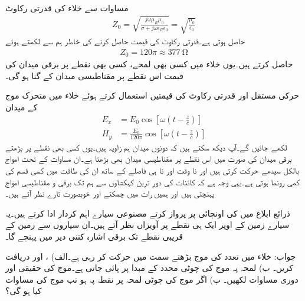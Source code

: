 مساوات  سے خلاء کی قدرتی رکاوٹ
\begin{align*}
Z_0 =\sqrt{\frac{j \omega \mu_R \mu_0}{\sigma +j \omega \epsilon_R \epsilon_0}}=\sqrt{\frac{\mu_0}{\epsilon_0}}
\end{align*}
حاصل ہوتی ہے۔قدرتی رکاوٹ کی قیمت حاصل کرنے کی خاطر ہم  سے  لکھتے ہوئے
\begin{align}
Z_0=120 \pi \approx \SI{377}{\ohm}
\end{align}
حاصل کرتے ہیں۔یوں خلاء میں کسی بھی لمحے، کسی بھی نقطے پر برقی میدان کی قیمت اس نقطے پر مقناطیسی میدان کے  گنا ہو گی۔

حرکی مستقل اور قدرتی رکاوٹ کی قیمتیں استعمال کرتے ہوئے خلاء میں متحرک موج کے میدان
\begin{align*}
E_x&=E_0 \cos \left[\omega \left( t -\frac{z}{c} \right)\right]\\
H_y&=\frac{E_0}{120 \pi} \cos \left[ \omega \left( t -\frac{z}{c} \right) \right]
\end{align*}
لکھے جائیں گے۔آپ دیکھ سکتے ہیں کہ دونوں میدان ہم زاویہ ہیں۔یوں کسی بھی نقطے پر بڑھتے برقی میدان کی صورت میں اس نقطے پر مقناطیسی میدان بھی بڑھتا ہے۔ان مساوات کے تحت امواج بالکل سیدھے حرکت کرتی ہیں اور نا وقت اور نا ہی فاصلے کے ساتھ ان کی طاقت میں کسی قسم کی کمی رونما ہوتی ہے۔یہی وجہ ہے کہ کائنات کی دور ترین کہکشاوں سے ہم تک برقی و مقناطیسی امواج پہنچتی ہیں اور ہمیں رات میں چمکتے اور خوبصورت تارے نظر آتے ہیں۔


 ذرائع ابلاغ میں  کی اونچائی پر پرواز کرتے مصنوعی سیارے اہم کردار ادا کرتے ہیں۔یہ سیارے زمین کے اوپر ایک ہی نقطے پر آویزاں نظر آتے ہیں۔ان سیاروں سے زمین کے قریبی نقطے تک برقی اشارہ کتنی دیر میں پہنچے گا۔

جواب:
خلاء میں  تعدد کی موج بڑھتے  سمت میں حرکت کر رہی ہے۔الف) ،  اور  دریافت کریں۔ ب) لمحہ  پہ موج کی  چوٹی  محدد کے مبدا پر پائی جاتی ہے۔موج کی حقیقی اور دوری مساوات لکھیں۔ پ) اگر موج کی چوٹی لمحہ  پر نقطہ  پہ ہو تب موج کی مساوات کیا ہو گی؟ 

